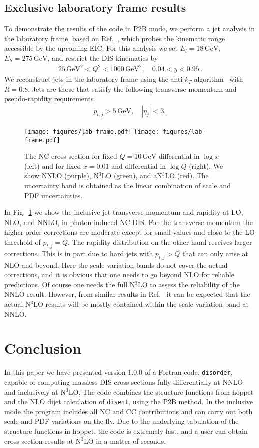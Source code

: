 \documentclass[submission, PhysCodeb]{SciPost_better_arXiv}
\newcommand{\hoppet}{{\sc hoppet}}
\newcommand{\disent}{{\tt disent}}
\newcommand{\disorder}{{\tt disorder}}
\newcommand{\GEV}{\,\mathrm{GeV}}
\newcommand{\NNNLO}{N$^3$LO}
\begin{document}
\subsection{Exclusive laboratory frame results}
To demonstrate the results of the code in P2B mode, we perform a jet
analysis in the laboratory frame, based on Ref.~\cite{Borsa:2022cap},
which probes the kinematic range accessible by the upcoming EIC. For
this analysis we set $E_l=18\GEV$, $E_h=275\GEV$, and restrict the DIS
kinematics by
\begin{align}
  25\GEV^2 < Q^2 < 1000 \GEV^2, \quad 0.04 < y < 0.95\,.
\end{align}
We reconstruct jets in the laboratory frame using the anti-$k_T$
algorithm~\cite{Cacciari:2008gp} with $R=0.8$. Jets are those that
satisfy the following transverse momentum and pseudo-rapidity requirements
\begin{align}
  p_{t,j} > 5 \GEV, \quad |\eta_j| < 3\,.
\end{align}
\begin{figure}[tb!]
  \centering\texttt{[image: figures/lab-frame.pdf]}
  \centering\texttt{[image: figures/lab-frame.pdf]}
  \caption{The NC cross section for fixed $Q=10\GEV$ differential in
    $\log x$ (left) and for fixed $x=0.01$ and differential in $\log
    Q$ (right). We show NNLO (purple), \NNNLO{} (green), and a\NNNLO{}
    (red). The uncertainty band is obtained as the linear combination
    of scale and PDF uncertainties.}
  \label{fig:labframe}
\end{figure}
In Fig.~\ref{fig:labframe} we show the inclusive jet transverse
momentum and rapidity at LO, NLO, and NNLO, in photon-induced NC
DIS. For the transverse momentum the higher order corrections are
moderate except for small values and close to the LO threshold of
$p_{t,j}=Q$. The rapidity distribution on the other hand receives
larger corrections. This is in part due to hard jets with $p_{t,j}>Q$
that can only arise at NLO and beyond. Here the scale variation bands
do not cover the actual corrections, and it is obvious that one needs
to go beyond NLO for reliable predictions. Of course one needs the
full \NNNLO{} to assess the reliability of the NNLO result. However,
from similar results in Ref.~\cite{Currie:2018fgr} it can be expected
that the actual \NNNLO{} results will be mostly contained within the
scale variation band at NNLO.

\section{Conclusion}
\label{sec:conclusion}
In this paper we have presented version 1.0.0 of a Fortran code,
\disorder{}, capable of computing massless DIS cross sections fully
differentially at NNLO and inclusively at \NNNLO{}. The code combines
the structure functions from \hoppet{} and the NLO dijet
calculation of \disent{}, using the P2B method. In the inclusive mode
the program includes all NC and CC contributions and can carry out
both scale and PDF variations on the fly. Due to the underlying
tabulation of the structure functions in \hoppet{}, the code is
extremely fast, and a user can obtain cross section results at
\NNNLO{} in a matter of seconds.
\end{document}
